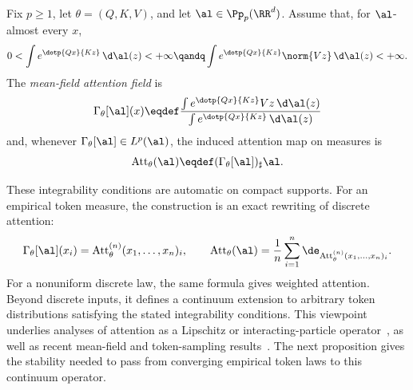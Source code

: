 \begin{defn}\label{def-mean-field-attention-map}
	Fix \(p\geq1\), let \(\theta=(Q,K,V)\), and let \(\al\in\Pp_p(\RR^d)\). Assume that, for \(\al\)-almost every \(x\),
	\[
		0<\int e^{\dotp{Qx}{Kz}}\,\d\al(z)<+\infty
		\qandq
		\int e^{\dotp{Qx}{Kz}}\norm{Vz}\,\d\al(z)<+\infty.
	\]
	The \emph{mean-field attention field} is
	\begin{equation}\label{eq-mean-field-attention}
		\Gamma_\theta[\al](x)
		\eqdef
		\frac{\int e^{\dotp{Qx}{Kz}}Vz\,\d\al(z)}
		{\int e^{\dotp{Qx}{Kz}}\,\d\al(z)}
	\end{equation}
	and, whenever \(\Gamma_\theta[\al]\in L^p(\al)\), the induced attention map on measures is
	\[
		\operatorname{Att}_\theta(\al)
		\eqdef
		(\Gamma_\theta[\al])_\sharp\al.
	\]
\end{defn}
These integrability conditions are automatic on compact supports. For an empirical token measure, the construction is an exact rewriting of discrete attention:
\[
	\Gamma_\theta[\al](x_i)
	=
	\operatorname{Att}^{(n)}_\theta(x_1,\ldots,x_n)_i,
	\qquad
	\operatorname{Att}_\theta(\al)
	=
	\frac1n\sum_{i=1}^n
	\de_{\operatorname{Att}^{(n)}_\theta(x_1,\ldots,x_n)_i}.
\]
For a nonuniform discrete law, the same formula gives weighted attention. Beyond discrete inputs, it defines a continuum extension to arbitrary token distributions satisfying the stated integrability conditions. This viewpoint underlies analyses of attention as a Lipschitz or interacting-particle operator~\cite{Vuckovic2020MathematicalAttention,Geshkovski2023MathematicalPerspective}, as well as recent mean-field and token-sampling results~\cite{Castin2025DynamicsTransformers,Bohbot2025TokenSampleComplexity}. The next proposition gives the stability needed to pass from converging empirical token laws to this continuum operator.

